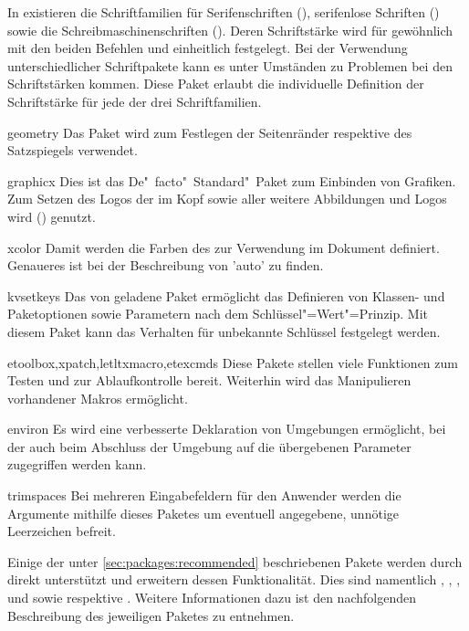\begin{packages}
{  }%
  In  existieren die Schriftfamilien für Serifenschriften 
  (), serifenlose Schriften () sowie die 
  Schreibmaschinenschriften (). Deren Schriftstärke wird für 
  gewöhnlich mit den beiden Befehlen  und  
  einheitlich festgelegt. Bei der Verwendung unterschiedlicher Schriftpakete 
  kann es unter Umständen zu Problemen bei den Schriftstärken kommen. Diese 
  Paket erlaubt die individuelle Definition der Schriftstärke für jede der drei 
  Schriftfamilien.
\item[geometry]
  Das Paket wird zum Festlegen der Seitenränder respektive des Satzspiegels 
  verwendet.
\item[graphicx]
  Dies ist das De"~facto"~Standard"~Paket zum Einbinden von Grafiken. Zum 
  Setzen des Logos der \TnUD im Kopf sowie aller weitere Abbildungen und Logos 
  wird () genutzt.
\item[xcolor]
  Damit werden die Farben des \CDs zur Verwendung im Dokument definiert. 
  Genaueres ist bei der Beschreibung von 'auto' zu finden. 
\item[kvsetkeys]
  Das von  geladene Paket  ermöglicht das 
  Definieren von Klassen- und Paketoptionen sowie Parametern nach dem 
  Schlüssel"=Wert"=Prinzip. Mit diesem Paket kann das Verhalten für unbekannte 
  Schlüssel festgelegt werden.
\item[etoolbox,xpatch,letltxmacro,etexcmds]
  Diese Pakete stellen viele Funktionen zum Testen und zur Ablaufkontrolle 
  bereit. Weiterhin wird das Manipulieren vorhandener Makros ermöglicht.
\item[environ]
  Es wird eine verbesserte Deklaration von Umgebungen ermöglicht, bei der auch 
  beim Abschluss der Umgebung auf die übergebenen Parameter zugegriffen werden 
  kann. 
\item[trimspaces]
  Bei mehreren Eingabefeldern für den Anwender werden die Argumente mithilfe 
  dieses Paketes um eventuell angegebene, unnötige Leerzeichen befreit.
\end{packages}



%
Einige der unter \autoref{sec:packages:recommended} beschriebenen Pakete werden 
durch \TUDScript direkt unterstützt und erweitern dessen Funktionalität. Dies
sind namentlich , , , 
 und  sowie  respektive 
. Weitere Informationen dazu ist den nachfolgenden 
Beschreibung des jeweiligen Paketes zu entnehmen.



